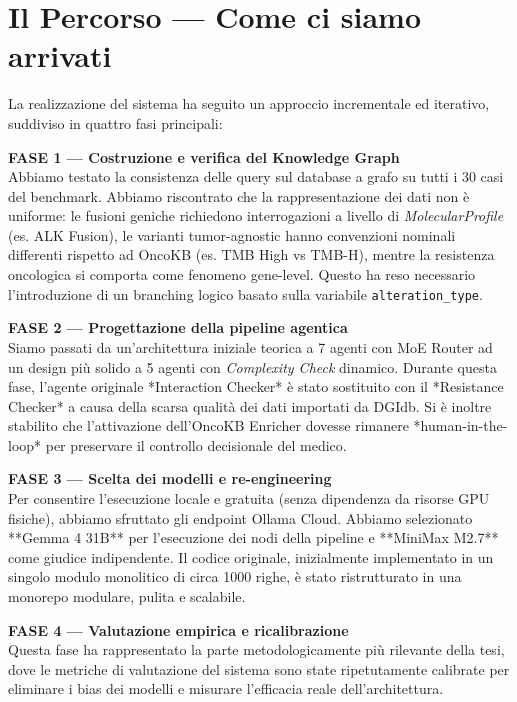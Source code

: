 \documentclass[12pt, a4paper]{article}
\begin{document}
\section{Il Percorso --- Come ci siamo arrivati}
La realizzazione del sistema ha seguito un approccio incrementale ed iterativo, suddiviso in quattro fasi principali:

\textbf{FASE 1 --- Costruzione e verifica del Knowledge Graph}\\
Abbiamo testato la consistenza delle query sul database a grafo su tutti i 30 casi del benchmark. Abbiamo riscontrato che la rappresentazione dei dati non è uniforme: le fusioni geniche richiedono interrogazioni a livello di \textit{MolecularProfile} (es. ALK Fusion), le varianti tumor-agnostic hanno convenzioni nominali differenti rispetto ad OncoKB (es. TMB High vs TMB-H), mentre la resistenza oncologica si comporta come fenomeno gene-level. Questo ha reso necessario l'introduzione di un branching logico basato sulla variabile \texttt{alteration\_type}.

\textbf{FASE 2 --- Progettazione della pipeline agentica}\\
Siamo passati da un'architettura iniziale teorica a 7 agenti con MoE Router ad un design più solido a 5 agenti con \textit{Complexity Check} dinamico. Durante questa fase, l'agente originale *Interaction Checker* è stato sostituito con il *Resistance Checker* a causa della scarsa qualità dei dati importati da DGIdb. Si è inoltre stabilito che l'attivazione dell'OncoKB Enricher dovesse rimanere *human-in-the-loop* per preservare il controllo decisionale del medico.

\textbf{FASE 3 --- Scelta dei modelli e re-engineering}\\
Per consentire l'esecuzione locale e gratuita (senza dipendenza da risorse GPU fisiche), abbiamo sfruttato gli endpoint Ollama Cloud. Abbiamo selezionato **Gemma 4 31B** per l'esecuzione dei nodi della pipeline e **MiniMax M2.7** come giudice indipendente. Il codice originale, inizialmente implementato in un singolo modulo monolitico di circa 1000 righe, è stato ristrutturato in una monorepo modulare, pulita e scalabile.

\textbf{FASE 4 --- Valutazione empirica e ricalibrazione}\\
Questa fase ha rappresentato la parte metodologicamente più rilevante della tesi, dove le metriche di valutazione del sistema sono state ripetutamente calibrate per eliminare i bias dei modelli e misurare l'efficacia reale dell'architettura.
\end{document}
